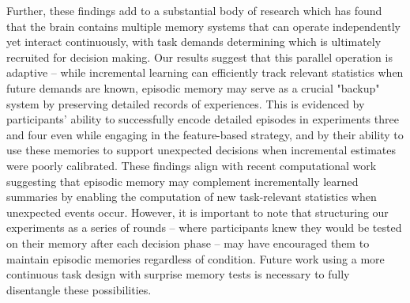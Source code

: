 \documentclass[10pt,letterpaper]{article}
\begin{document}
Further, these findings add to a substantial body of research which has found that the brain contains multiple memory systems that can operate independently yet interact continuously\cite{packardInactivationHippocampusCaudate1996, squireStructureFunctionDeclarative1996, poldrackCompetitionMultipleMemory2003, poldrackInteractiveMemorySystems2001, shohamyHabitsReinforcementLearning2014, montaser-kouhsariTwoRoutesValuebased2024}, with task demands determining which is ultimately recruited for decision making\cite{dawUncertaintybasedCompetitionPrefrontal2005, nicholasUncertaintyAltersBalance2022, leeNeuralComputationsUnderlying2014}. Our results suggest that this parallel operation is adaptive -- while incremental learning can efficiently track relevant statistics when future demands are known, episodic memory may serve as a crucial "backup" system by preserving detailed records of experiences. This is evidenced by participants' ability to successfully encode detailed episodes in experiments three and four even while engaging in the feature-based strategy, and by their ability to use these memories to support unexpected decisions when incremental estimates were poorly calibrated. These findings align with recent computational work\cite{nagyInterplayEpisodicSemantic2025} suggesting that episodic memory may complement incrementally learned summaries by enabling the computation of new task-relevant statistics when unexpected events occur. However, it is important to note that structuring our experiments as a series of rounds -- where participants knew they would be tested on their memory after each decision phase -- may have encouraged them to maintain episodic memories regardless of condition. Future work using a more continuous task design with surprise memory tests is necessary to fully disentangle these possibilities.
\end{document}
